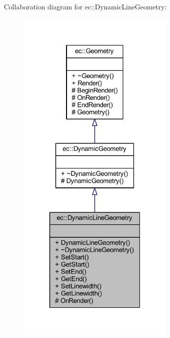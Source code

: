 Collaboration diagram for ec\+:\+:Dynamic\+Line\+Geometry\+:
\nopagebreak
\begin{figure}[H]
\begin{center}
\leavevmode
\includegraphics[width=217pt]{classec_1_1_dynamic_line_geometry__coll__graph}
\end{center}
\end{figure}
